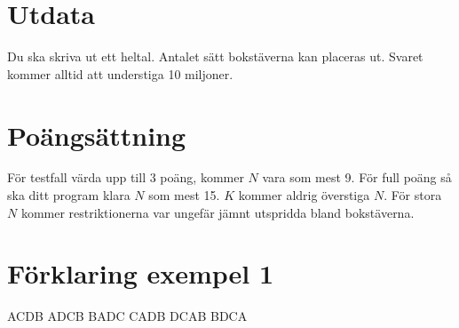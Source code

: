 \section*{Utdata}

Du ska skriva ut ett heltal. Antalet sätt bokstäverna kan
placeras ut. Svaret kommer alltid att understiga 10 miljoner.

\section*{Poängsättning}

För testfall värda upp till $3$ poäng, kommer $N$ vara som mest 9. För full
poäng så ska ditt program klara $N$ som mest 15. $K$ kommer aldrig överstiga $N$.
För stora $N$ kommer restriktionerna var ungefär jämnt utspridda bland
bokstäverna.

\section*{Förklaring exempel 1}

ACDB
ADCB
BADC
CADB
DCAB
BDCA
